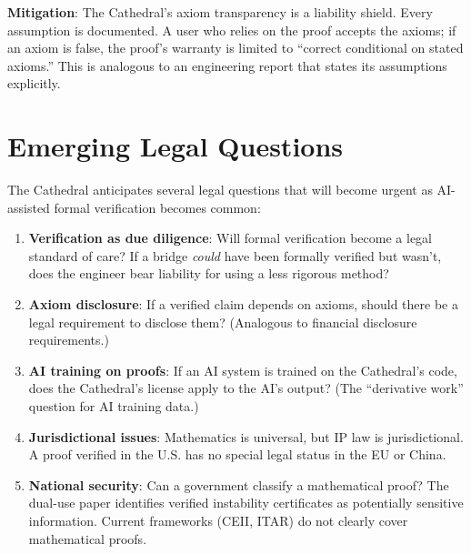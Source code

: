 \documentclass[11pt,a4paper]{article}
\begin{document}
\textbf{Mitigation}: The Cathedral's axiom transparency is a
liability shield. Every assumption is documented. A user who relies
on the proof accepts the axioms; if an axiom is false, the proof's
warranty is limited to ``correct conditional on stated axioms.''
This is analogous to an engineering report that states its
assumptions explicitly.

\section{Emerging Legal Questions}

The Cathedral anticipates several legal questions that will become
urgent as AI-assisted formal verification becomes common:

\begin{enumerate}
  \item \textbf{Verification as due diligence}: Will formal
    verification become a legal standard of care? If a bridge
    \emph{could} have been formally verified but wasn't, does
    the engineer bear liability for using a less rigorous method?

  \item \textbf{Axiom disclosure}: If a verified claim depends on
    axioms, should there be a legal requirement to disclose them?
    (Analogous to financial disclosure requirements.)

  \item \textbf{AI training on proofs}: If an AI system is trained
    on the Cathedral's code, does the Cathedral's license apply to
    the AI's output? (The ``derivative work'' question for AI
    training data.)

  \item \textbf{Jurisdictional issues}: Mathematics is universal,
    but IP law is jurisdictional. A proof verified in the U.S.
    has no special legal status in the EU or China.

  \item \textbf{National security}: Can a government classify a
    mathematical proof? The dual-use paper identifies verified
    instability certificates as potentially sensitive information.
    Current frameworks (CEII, ITAR) do not clearly cover
    mathematical proofs.
\end{enumerate}

\end{document}
